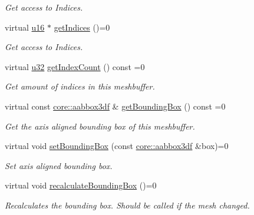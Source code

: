 \begin{DoxyCompactItemize}
\begin{DoxyCompactList}\small\item\em Get access to Indices. \end{DoxyCompactList}\item 
virtual \hyperlink{namespaceirr_ae9f8ec82692ad3b83c21f555bfa70bcc}{u16} $\ast$ \hyperlink{classirr_1_1scene_1_1IMeshBuffer_a3d33a561023314677361e30cf07ae429}{get\+Indices} ()=0
\begin{DoxyCompactList}\small\item\em Get access to Indices. \end{DoxyCompactList}\item 
virtual \hyperlink{namespaceirr_a0416a53257075833e7002efd0a18e804}{u32} \hyperlink{classirr_1_1scene_1_1IMeshBuffer_a96e08662e15b1205516b87ada3301551}{get\+Index\+Count} () const =0
\begin{DoxyCompactList}\small\item\em Get amount of indices in this meshbuffer. \end{DoxyCompactList}\item 
virtual const \hyperlink{namespaceirr_1_1core_a60f4b4c744aba55f10530d503c6ecb04}{core\+::aabbox3df} \& \hyperlink{classirr_1_1scene_1_1IMeshBuffer_ac53fe1096756a40f25dae25911e27c51}{get\+Bounding\+Box} () const =0
\begin{DoxyCompactList}\small\item\em Get the axis aligned bounding box of this meshbuffer. \end{DoxyCompactList}\item 
virtual void \hyperlink{classirr_1_1scene_1_1IMeshBuffer_adbbfb7757dfbba7357193d2280893df6}{set\+Bounding\+Box} (const \hyperlink{namespaceirr_1_1core_a60f4b4c744aba55f10530d503c6ecb04}{core\+::aabbox3df} \&box)=0
\begin{DoxyCompactList}\small\item\em Set axis aligned bounding box. \end{DoxyCompactList}\item 
\mbox{\label{classirr_1_1scene_1_1IMeshBuffer_a161877fc3afe29a816440db12a71785d}} 
virtual void \hyperlink{classirr_1_1scene_1_1IMeshBuffer_a161877fc3afe29a816440db12a71785d}{recalculate\+Bounding\+Box} ()=0
\begin{DoxyCompactList}\small\item\em Recalculates the bounding box. Should be called if the mesh changed. \end{DoxyCompactList}\item 

\end{DoxyCompactItemize}
